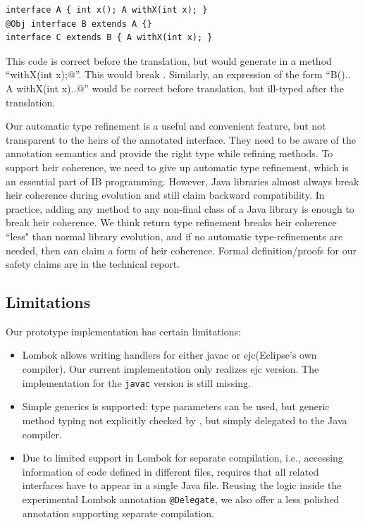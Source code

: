 \begin{lstlisting}
interface A { int x(); A withX(int x); }
@Obj interface B extends A {}
interface C extends B { A withX(int x); }
\end{lstlisting}

\noindent This code is correct before the translation, but \mixin would  generate in \Q@B@  a method ``\Q@B withX(int x);@''.
This would break \Q@C@.
Similarly, an expression of the form ``\Q@new B(){.. A withX(int x){..}}@''
would be correct before translation, but ill-typed after the translation.

Our automatic type refinement is a useful and convenient feature, but
not transparent to the heirs of the annotated interface.  They need to
be aware of the annotation semantics and provide the right type while
refining methods. To support heir coherence, we need
to give up automatic type refinement, which is an essential part of IB programming.
However, Java libraries almost always break heir
coherence during evolution and still claim backward compatibility. In practice, adding any method to any
non-final class of a Java library is enough to break heir
coherence.  We think return type refinement breaks heir coherence ``less" than normal library evolution, and
if no automatic type-refinements are needed, then \mixin can claim a
form of heir coherence.
Formal definition/proofs for our safety claims are in the
technical report.

\subsection{Limitations}
Our prototype implementation has certain limitations:
\begin{itemize}
\item Lombok allows writing handlers for either javac or ejc(Eclipse's own compiler).
Our current implementation only realizes ejc version. The implementation for
  the \texttt{javac} version is still missing.
\item Simple generics is supported:
type parameters can be used, but generic
method typing %
not explicitly checked by \mixin, but simply delegated to the Java compiler.
\item 
Due to limited support in Lombok for separate compilation, i.e., 
accessing information of code defined in different files, \mixin 
requires that all
  related interfaces have to appear in a single Java file.
Reusing the logic inside the experimental Lombok annotation \lstinline{@Delegate},
we also offer a less polished annotation supporting
separate compilation.
\end{itemize}


